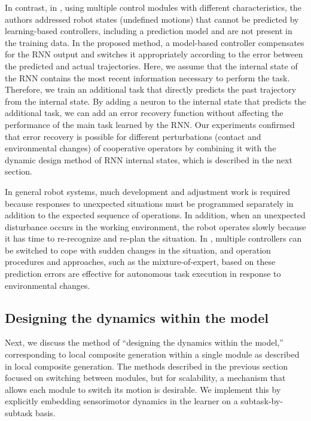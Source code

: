 In contrast, in \cite{Suzuki2021ral}, using multiple control modules with different characteristics, the authors addressed robot states (undefined motions) that cannot be predicted by learning-based controllers, including a prediction model and are not present in the training data. In the proposed method, a model-based controller compensates for the RNN output and switches it appropriately according to the error between the predicted and actual trajectories. Here, we assume that the internal state of the RNN contains the most recent information necessary to perform the task. Therefore, we train an additional task that directly predicts the past trajectory from the internal state. By adding a neuron to the internal state that predicts the additional task, we can add an error recovery function without affecting the performance of the main task learned by the RNN. Our experiments confirmed that error recovery is possible for different perturbations (contact and environmental changes) of cooperative operators by combining it with the dynamic design method of RNN internal states, which is described in the next section.

In general robot systems, much development and adjustment work is required because responses to unexpected situations must be programmed separately in addition to the expected sequence of operations. In addition, when an unexpected disturbance occurs in the working environment, the robot operates slowly because it has time to re-recognize and re-plan the situation. In \cite{Ito2022sr,Suzuki2021ral}, multiple controllers can be switched to cope with sudden changes in the situation, and operation procedures and approaches, such as the mixture-of-expert, based on these prediction errors are effective for autonomous task execution in response to environmental changes.




\subsection{Designing the dynamics within the model}
Next, we discuss the method of ``designing the dynamics within the model,'' corresponding to local composite generation within a single module as described in local composite generation. The methods described in the previous section focused on switching between modules, but for scalability, a mechanism that allows each module to switch its motion is desirable. We implement this by explicitly embedding sensorimotor dynamics in the learner on a subtask-by-subtask basis.

